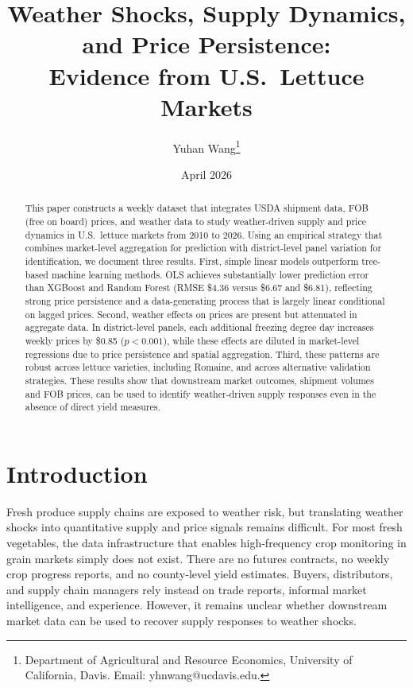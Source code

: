 \documentclass[12pt]{article}
\title{Weather Shocks, Supply Dynamics, and Price Persistence: \\ Evidence from U.S.\ Lettuce Markets}
\author{Yuhan Wang\thanks{Department of Agricultural and Resource Economics, University of California, Davis. Email: yhnwang@ucdavis.edu.}}
\date{April 2026}
\begin{document}
\maketitle

\begin{abstract}
\noindent
This paper constructs a weekly dataset that integrates USDA shipment data, FOB (free on board) prices, and weather data to study weather-driven supply and price dynamics in U.S.\ lettuce markets from 2010 to 2026. Using an empirical strategy that combines market-level aggregation for prediction with district-level panel variation for identification, we document three results. First, simple linear models outperform tree-based machine learning methods. OLS achieves substantially lower prediction error than XGBoost and Random Forest (RMSE \$4.36 versus \$6.67 and \$6.81), reflecting strong price persistence and a data-generating process that is largely linear conditional on lagged prices. Second, weather effects on prices are present but attenuated in aggregate data. In district-level panels, each additional freezing degree day increases weekly prices by \$0.85 ($p < 0.001$), while these effects are diluted in market-level regressions due to price persistence and spatial aggregation. Third, these patterns are robust across lettuce varieties, including Romaine, and across alternative validation strategies. These results show that downstream market outcomes, shipment volumes and FOB prices, can be used to identify weather-driven supply responses even in the absence of direct yield measures.
\end{abstract}

\newpage
\tableofcontents
\newpage

\section{Introduction}
\label{sec:intro}

Fresh produce supply chains are exposed to weather risk, but translating weather shocks into quantitative supply and price signals remains difficult. For most fresh vegetables, the data infrastructure that enables high-frequency crop monitoring in grain markets simply does not exist. There are no futures contracts, no weekly crop progress reports, and no county-level yield estimates. Buyers, distributors, and supply chain managers rely instead on trade reports, informal market intelligence, and experience. However, it remains unclear whether downstream market data can be used to recover supply responses to weather shocks.
\end{document}
